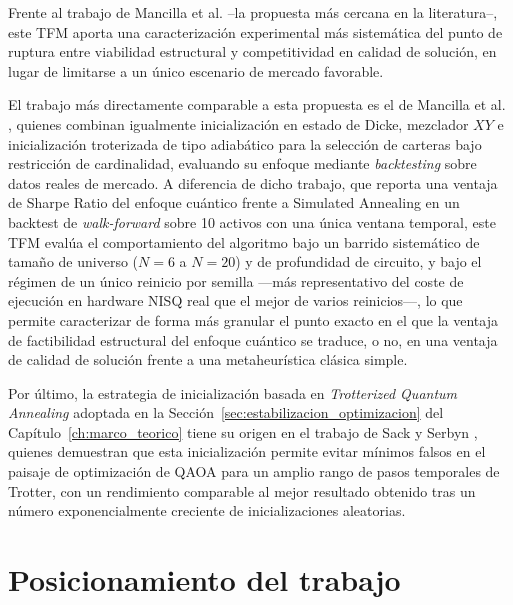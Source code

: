 Frente al trabajo de Mancilla et al. \cite{Mancilla2026} --la propuesta más cercana en la
literatura--, este TFM aporta una caracterización experimental más sistemática del punto
de ruptura entre viabilidad estructural y competitividad en calidad de solución, en lugar
de limitarse a un único escenario de mercado favorable.

El trabajo más directamente comparable a esta propuesta es el de Mancilla et al.
\cite{Mancilla2026}, quienes combinan igualmente inicialización en estado de Dicke,
mezclador $XY$ e inicialización troterizada de tipo adiabático para la selección de
carteras bajo restricción de cardinalidad, evaluando su enfoque mediante \textit{backtesting}
sobre datos reales de mercado. A diferencia de dicho trabajo, que reporta una ventaja de
Sharpe Ratio del enfoque cuántico frente a Simulated Annealing en un backtest de
\textit{walk-forward} sobre 10 activos con una única ventana temporal, este TFM evalúa el
comportamiento del algoritmo bajo un barrido sistemático de tamaño de universo
($N=6$ a $N=20$) y de profundidad de circuito, y bajo el régimen de un único reinicio por
semilla —más representativo del coste de ejecución en hardware NISQ real que el mejor de
varios reinicios—, lo que permite caracterizar de forma más granular el punto exacto en el
que la ventaja de factibilidad estructural del enfoque cuántico se traduce, o no, en una
ventaja de calidad de solución frente a una metaheurística clásica simple.

Por último, la estrategia de inicialización basada en \textit{Trotterized Quantum
Annealing} adoptada en la Sección~\ref{sec:estabilizacion_optimizacion} del
Capítulo~\ref{ch:marco_teorico} tiene su origen en el trabajo de Sack y Serbyn
\cite{SackSerbyn2021}, quienes demuestran que esta inicialización permite evitar mínimos
falsos en el paisaje de optimización de QAOA para un amplio rango de pasos temporales de
Trotter, con un rendimiento comparable al mejor resultado obtenido tras un número
exponencialmente creciente de inicializaciones aleatorias.

\section{Posicionamiento del trabajo}
\label{sec:sintesis_posicionamiento}

